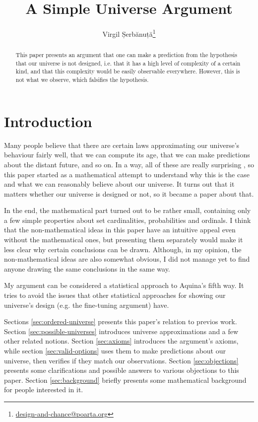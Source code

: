 \documentclass[a4paper
,draft
]{article}
\title{A Simple Universe Argument}
\author{Virgil Șerbănuță\thanks{\href{mailto:design-and-chance@poarta.org}{design-and-chance@poarta.org}}}
\newcommand{\svn}[2][]{\todo[author=Virgil,color=red!25!white,#1]{#2}}
\newcommand{\paper}[1]{paper}
\begin{document}
\maketitle

 \begin{abstract}
  This \paper{} presents an argument that one can make a prediction from
  the hypothesis that our universe is not designed, i.e. that it has a high
  level of complexity of a certain kind, and that this complexity would be
  easily observable everywhere. However, this is not what we observe, which
  falsifies the hypothesis.
\end{abstract}

\section{Introduction}

Many people believe
that there are certain laws approximating our universe's behaviour fairly well,
that we can compute its age,
that we can make predictions about the distant future, and so on.
In a way, all of these are really surprising
\svn{Maybe move the Feinmann quote from below to here},
so this \paper{} started as a
mathematical attempt to understand why this is the case
and what we can reasonably believe about our universe.
It turns out that it matters
whether our universe is designed or not, so it became a \paper{} about that.

In the end, the mathematical part turned out to be rather small,
containing only a few simple properties about set cardinalities,
probabilities and ordinals.
I think that the non-mathematical ideas in this paper
have an intuitive appeal even without the mathematical ones,
but presenting them separately would make it less clear why certain
conclusions can be drawn.
Although, in my opinion, the non-mathematical ideas are also somewhat obvious,
I did not manage yet to find anyone drawing the same conclusions
in the same way.

My argument can be considered a statistical approach to Aquina's fifth way.
It tries to avoid the issues that other statistical approaches for showing
our universe's design (e.g. the fine-tuning argument) have.

Sections \ref{sec:ordered-universe} presents this paper's relation to
previos work.
Section \ref{sec:possible-universes} introduces universe approximations
and a few other related notions.
Section \ref{sec:axioms} introduces the argument's axioms,
while section \ref{sec:valid-options} uses them to make predictions
about our universe, then verifies if they match our observations.
Section \ref{sec:objections} presents some clarifications and possible
answers to various objections to this paper.
Section \ref{sec:background}
briefly presents some mathematical background for people interested in it.
\end{document}
